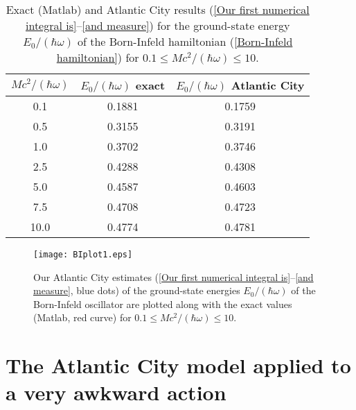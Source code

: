 \documentclass[prd,preprint,floatfix,showpacs]{revtex4-1}
\begin{document}
\par
\begin{table}[h]
\caption{Exact (Matlab) and 
Atlantic City  results 
(\ref {Our first numerical integral is}--\ref {and measure})
for the ground-state energy \( E_0/(\hbar \omega) \) 
of the Born-Infeld hamiltonian
(\ref{Born-Infeld hamiltonian})
for \( 0.1 \le Mc^2/(\hbar \omega) \le 10 \)\@.}
\begin{center}
\begin{tabular}{|c|c|c|}
\hline
\( Mc^2/(\hbar \omega) \)& \( E_0/(\hbar \omega) \) exact 
& \(E_0/(\hbar \omega)\)  Atlantic City \\
\hline
0.1&0.1881&0.1759\\
\hline
0.5&0.3155&0.3191\\
\hline
1.0&0.3702&0.3746\\
\hline
2.5&0.4288&0.4308\\
\hline
5.0&0.4587&0.4603\\
\hline
7.5&0.4708&0.4723\\
\hline
10.0&0.4774&0.4781\\
\hline
\end{tabular}
\end{center}
\label {bigMasses}
\end{table}

\begin{figure}[h]
\begin{center}
\texttt{[image: BIplot1.eps]}
\caption{Our Atlantic City  estimates 
(\ref {Our first numerical integral is}--\ref {and measure}, blue dots) 
of the ground-state energies \( E_0/(\hbar \omega) \)
of the Born-Infeld oscillator are plotted along 
with the exact values (Matlab, red curve) 
for \( 0.1 \le Mc^2/(\hbar \omega) \le 10 \)\@.}
\label {Born-Infeld big masses}
\end{center}
\end{figure}






\section{The Atlantic City model applied to a very awkward action
\label{The Atlantic City model applied to a very awkward action}}
\end{document}
